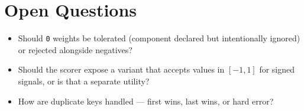 \section{Open Questions}
\begin{itemize}[leftmargin=1.2em]
  \item Should \texttt{0} weights be tolerated (component declared but intentionally ignored) or rejected alongside negatives?
  \item Should the scorer expose a variant that accepts values in \([-1, 1]\) for signed signals, or is that a separate utility?
  \item How are duplicate keys handled --- first wins, last wins, or hard error?
\end{itemize}


